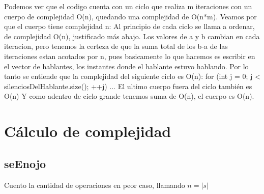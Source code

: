\documentclass{article}
\begin{document}
Podemos ver que el codigo cuenta con un ciclo que realiza m iteraciones con un cuerpo de complejidad O(n), quedando una
complejidad de O(n*m). \newline
Veamos por que el cuerpo tiene complejidad n: \newline
Al principio de cada ciclo se llama a ordenar, de complejidad O(n), justificado más abajo. \newline
Los valores de a y b cambian en cada iteracion, pero tenemos la certeza de que la suma total de los b-a de las
iteraciones estan acotados por n, pues basicamente lo que hacemos es escribir en el vector de hablantes, los instantes
donde el hablante estuvo hablando. Por lo tanto se entiende que la complejidad del siguiente ciclo es O(n): \newline
for (int j = 0; j < silenciosDelHablante.size(); ++j) { \newline
    ... \newline
} \newline
El ultimo cuerpo fuera del ciclo también es O(n) \newline
Y como adentro de ciclo grande tenemos suma de O(n), el cuerpo es O(n). \newline

\newpage
{}
\section*{Cálculo de complejidad}
\vspace{0.5cm}
\subsection{seEnojo}
Cuento la cantidad de operaciones en peor caso, llamando $n=|s|$
\end{document}
